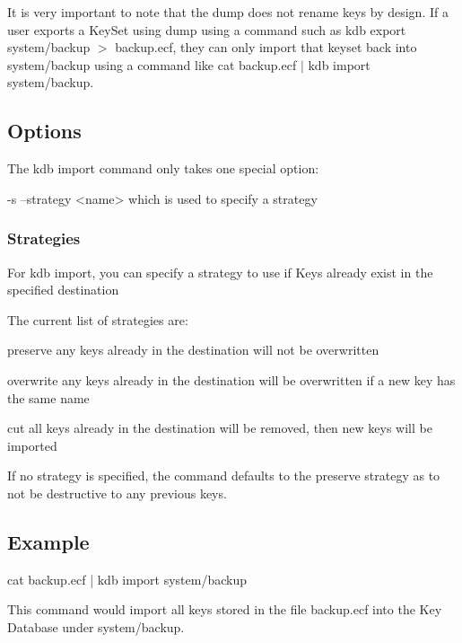 It is very important to note that the dump does not rename keys by design. If a user exports a Key\+Set using dump using a command such as {\ttfamily kdb export system/backup $>$ backup.\+ecf}, they can only import that keyset back into system/backup using a command like {\ttfamily cat backup.\+ecf $\vert$ kdb import system/backup}.

\subsection*{Options}

The kdb import command only takes one special option\+: \begin{DoxyVerb}    -s --strategy <name>            which is used to specify a strategy
\end{DoxyVerb}


\subsubsection*{Strategies}

For kdb import, you can specify a strategy to use if Keys already exist in the specified destination

The current list of strategies are\+: \begin{DoxyVerb}    preserve                                        any keys already in the destination will not be overwritten

    overwrite                                       any keys already in the destination will be overwritten if a new key has the same name

    cut                                                     all keys already in the destination will be removed, then new keys will be imported
\end{DoxyVerb}


If no strategy is specified, the command defaults to the preserve strategy as to not be destructive to any previous keys.

\subsection*{Example}

\begin{DoxyVerb}    cat backup.ecf | kdb import system/backup
\end{DoxyVerb}


This command would import all keys stored in the file backup.\+ecf into the Key Database under system/backup.


